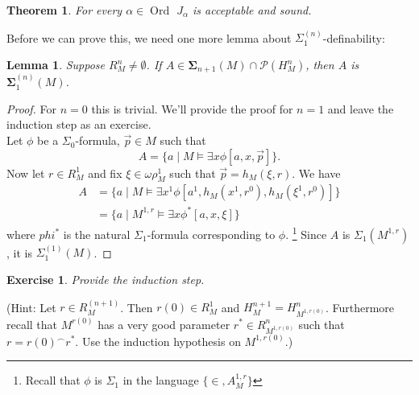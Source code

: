 \documentclass[12pt,a4paper]{article}
\theoremstyle{nicestyle}
\newtheorem{theorem}{Theorem}[subsection]
\newtheorem{exercise}{Exercise}[subsection]
\newtheorem{lemma}{Lemma}[subsection]
\DeclareMathOperator{\ord}{Ord}
\begin{document}
  \begin{theorem} \label{theorem: L is sound}
    For every $\alpha \in \ord$ $J_{\alpha}$ is acceptable and sound.
  \end{theorem}

  Before we can prove this, we need one more lemma about
  $\Sigma^{(n)}_{1}$-definability:

  \begin{lemma} \label{lemma: Sigma n+1 subsets of the n-th reduct}
    Suppose $R^{n}_{M} \neq \emptyset$. If
    $A \in \boldsymbol{\Sigma}_{n+1}(M) \cap \mathcal{P}(H^{n}_{M})$,
    then $A$ is $\boldsymbol{\Sigma}^{(n)}_{1}(M)$.
  \end{lemma}

  \begin{proof}
    For $n = 0$ this is trivial. We'll provide the proof for $n = 1$
    and leave the induction step as an exercise. \\
    Let $\phi$ be a $\Sigma_{0}$-formula, $\vec{p} \in M$ such that
    \[
      A = \{ a \mid M \models \exists x \phi[a,x,\vec{p}] \}.
    \]
    Now let $r \in R^{1}_{M}$ and fix $\xi \in \omega\rho^{1}_{M}$
    such that $\vec{p} = h_{M}(\xi, r)$. We have
    \begin{align*}
      A & = \{ a \mid M \models \exists x^{1} \phi[a^{1}, h_{M}(x^{1}, r^{0}), h_{M}(\xi^{1}, r^{0})] \} \\
      &= \{ a \mid M^{1, r} \models \exists x \phi^{*}[a, x, \xi] \}
    \end{align*}
    where $phi^{*}$ is the natural $\Sigma_{1}$-formula corresponding
    to $\phi$. \footnote{Recall that $\phi$ is $\Sigma_{1}$ in the
      language $\{ \in, A^{1, r}_{M} \}$} Since $A$ is
    $\Sigma_{1}(M^{1,r})$, it is $\Sigma^{(1)}_{1}(M)$.
  \end{proof}

  \begin{exercise}
    Provide the induction step.
  \end{exercise}

  (Hint: Let $r \in R^{(n+1)}_{M}$. Then $r(0) \in R^{1}_{M}$ and
  $H^{n+1}_{M} = H^{n}_{M^{1,r(0)}}$. Furthermore recall that
  $M^{r(0)}$ has a very good parameter $r^{*} \in R^{n}_{M^{1,r(0)}}$
  such that $r = r(0) ^{\frown} r^{*}$. Use the induction hypothesis
  on $M^{1, r(0)}$.)
\end{document}
